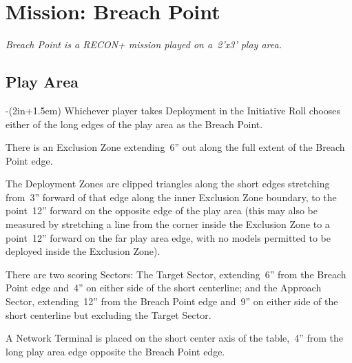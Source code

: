 \chapter{Mission: Breach Point}

\emph{\emph{Breach Point} is a RECON+ mission played on a~2'x3' play area.}

\section{Play Area}
\vspace{-2\parskip}
\noindent\begin{stdminipage}{\linewidth-(2in+1.5em)}
\vspace{0pt}   
\noindent
Whichever player takes Deployment in the Initiative Roll chooses
either of the long edges of the play area as the Breach Point.

There is an Exclusion Zone extending~6'' out along the full extent of
the Breach Point edge.

The Deployment Zones are clipped triangles along the short edges
stretching from~3'' forward of that edge along the inner Exclusion
Zone boundary, to the point~12'' forward on the opposite edge of the
play area (this may also be measured by stretching a line from the
corner inside the Exclusion Zone to a point~12'' forward on the far
play area edge, with no models permitted to be deployed inside the
Exclusion Zone).

There are two scoring Sectors: The Target Sector, extending~6'' from
the Breach Point edge and~4'' on either side of the short centerline;
and the Approach Sector, extending~12'' from the Breach Point edge
and~9'' on either side of the short centerline but excluding the
Target Sector.

A Network Terminal is placed on the short center axis of the
table,~4'' from the long play area edge opposite the Breach Point
edge.
\end{stdminipage}
\hfill
